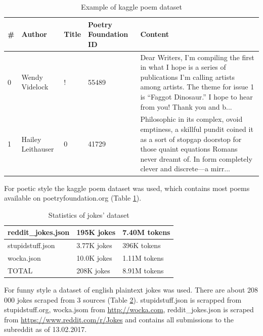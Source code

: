 \begin{table}[ht]
\centering
 \begin{tabular}{|p{0.5cm}|p{2cm}|p{1cm}|p{2cm}|p{7cm}|} 
 \hline\hline
 \textbf{\#} & \textbf{Author} & \textbf{Title} & \textbf{Poetry Foundation ID} & \textbf{Content} \\
 \hline\hline
 0 & Wendy Videlock & ! & 55489 & Dear Writers, I’m compiling the first in what I hope is a series of publications I’m calling artists among artists. The theme for issue 1 is “Faggot Dinosaur.” I hope to hear from you! Thank you and b... \\ 
 \hline
 1 &  Hailey Leithauser & 0 & 41729 & Philosophic in its complex, ovoid emptiness, a skillful pundit coined it as a sort of stopgap doorstop for those quaint equations Romans never dreamt of. In form completely clever and discrete—a mirr... \\
 \hline\hline
 \end{tabular}
 \caption{Example of kaggle poem dataset}
\label{tab:poetic}
\end{table}

For poetic style the kaggle poem dataset was used, which contains most poems available on poetryfoundation.org (Table \ref{tab:poetic}).

\begin{table}[ht]
\centering
 \begin{tabular}{|p{4cm}|p{3cm}|p{3cm}|} 
 \hline\hline
 reddit\_jokes.json & 195K jokes & 7.40M tokens \\
 \hline
 stupidstuff.json & 3.77K jokes & 396K tokens \\
 \hline
 wocka.json & 10.0K jokes & 1.11M tokens \\
 \hline\hline
 TOTAL & 208K jokes & 8.91M tokens \\
 \hline\hline
 \end{tabular}
 \caption{Statistics of jokes' dataset}
\label{tab:jokes}
\end{table}

For funny style a dataset of english plaintext jokes was used. There are about 208 000 jokes scraped from 3 sources (Table \ref{tab:jokes}). stupidstuff.json is scrapped from stupidstuff.org, wocka.jsom from \url{http://wocka.com}, reddit\_jokes.json is scraped from \url{https://www.reddit.com/r/Jokes} and contains all submissions to the subreddit as of 13.02.2017.


